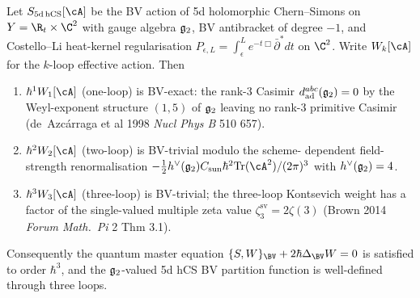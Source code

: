 \begin{theorem}
\label{thm:thy-qg-g2-three-loops}
Let $S_{5\mathrm{d\,hCS}}[\cA]$ be the BV action of 5d holomorphic
Chern--Simons on $Y = \R_t \times \C^2$ with gauge algebra $\mathfrak{g}_2$,
BV antibracket of degree $-1$, and Costello--Li heat-kernel
regularisation $P_{\epsilon, L} = \int_\epsilon^L e^{-t\Box}
\bar\partial^* dt$ on $\C^2$. Write $W_k[\cA]$ for the $k$-loop
effective action. Then
\begin{enumerate}[label=\textup{(\roman*)}]
\item $\hbar^1 W_1[\cA]$ (one-loop) is BV-exact: the rank-$3$ Casimir
$d^{abc}_{\mathrm{ad}}(\mathfrak{g}_2) = 0$ by the Weyl-exponent structure
$(1, 5)$ of $\mathfrak{g}_2$ leaving no rank-$3$ primitive Casimir
(de~Azc\'arraga et al 1998 \textit{Nucl Phys B} 510 657).
\item $\hbar^2 W_2[\cA]$ (two-loop) is BV-trivial modulo the scheme-
dependent field-strength renormalisation
$-\tfrac{1}{2} h^\vee(\gtwo) C_{\mathrm{sun}} \hbar^2 \mathrm{Tr}(\cA^2)
/ (2\pi)^3$ with $h^\vee(\mathfrak{g}_2) = 4$.
\item $\hbar^3 W_3[\cA]$ (three-loop) is BV-trivial; the three-loop
Kontsevich weight has a factor of the single-valued multiple zeta
value $\zeta^{\mathrm{sv}}_3 = 2\zeta(3)$ (Brown 2014
\textit{Forum Math.\ Pi} 2 Thm 3.1).
\end{enumerate}
Consequently the quantum master equation $\{S, W\}_{\BV} + 2\hbar
\Delta_{\BV} W = 0$ is satisfied to order $\hbar^3$, and the
$\mathfrak{g}_2$-valued 5d hCS BV partition function is well-defined through
three loops.
\end{theorem}

